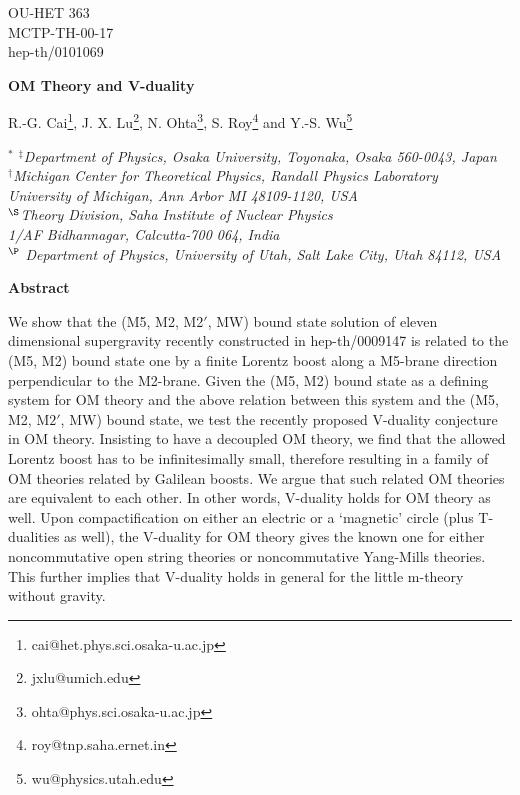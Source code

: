 \documentclass[a4paper,12pt]{article}
\begin{document}
\topmargin 0pt
\oddsidemargin 0mm

\renewcommand{\thefootnote}{\fnsymbol{footnote}}
\begin{titlepage}
\begin{flushright}
OU-HET 363\\
MCTP-TH-00-17\\
hep-th/0101069
\end{flushright}
\begin{center}
{\Large \bf  OM Theory and V-duality} 
\vspace{2mm} 
\begin{center}
{\large R.-G. Cai\footnote{cai@het.phys.sci.osaka-u.ac.jp},
        J. X. Lu\footnote{jxlu@umich.edu},
N. Ohta\footnote{ohta@phys.sci.osaka-u.ac.jp},
 S. Roy\footnote{roy@tnp.saha.ernet.in}
and Y.-S. Wu\footnote{wu@physics.utah.edu}\\}
\vspace{2mm}

{\em $^\ast$ $^\ddagger$Department of Physics, Osaka University,
 Toyonaka, Osaka 560-0043, Japan\\
$^\dagger$Michigan Center for Theoretical Physics, Randall Physics
 Laboratory\\
 University of Michigan, Ann Arbor MI 48109-1120, USA\\
$^\S$Theory Division, Saha Institute of Nuclear Physics\\
 1/AF Bidhannagar, Calcutta-700 064, India \\
$^\P$ Department of Physics, University of Utah, Salt Lake City, Utah 84112,
   USA}
\end{center}
\end{center}

\vspace{4mm}
\centerline{{\bf{Abstract}}}
\vspace{2mm}
\begin{small}
We show that the (M5, M2, M2$'$, MW) bound state solution of eleven 
dimensional supergravity  recently constructed in
hep-th/0009147 is related to  the (M5, M2) bound state one by a 
finite Lorentz boost along a M5-brane direction perpendicular to the 
M2-brane.  Given the (M5, M2) bound state as a defining system for OM 
theory and the above relation between this system and the 
(M5, M2, M$2'$, MW) bound state, we test the recently proposed V-duality 
conjecture in OM theory. Insisting to have a decoupled OM theory, we
find that the allowed Lorentz boost has to be infinitesimally small, 
therefore resulting in a family of OM theories related by  Galilean boosts. 
We argue that such related OM theories are equivalent to each other.
In other words,  V-duality holds for OM theory as well. Upon compactification
on either an electric or a `magnetic' circle (plus T-dualities as well),
the V-duality for OM theory gives the known one for either 
noncommutative open string theories or noncommutative Yang-Mills
theories. This further implies that V-duality holds in general for 
the little m-theory without gravity.
\end{small}

\end{titlepage}
\end{document}
